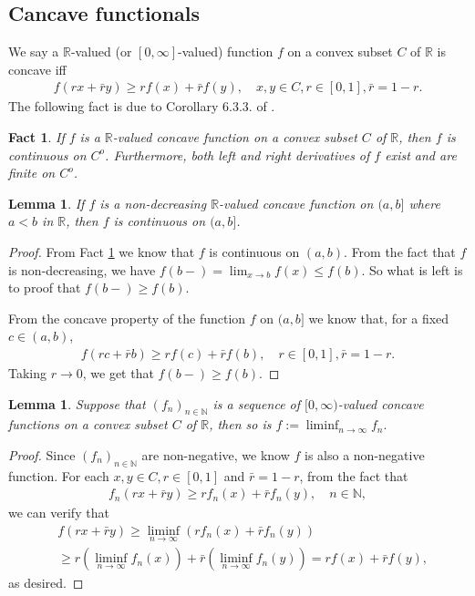 \documentclass[12pt,a4paper]{amsart}
\numberwithin{equation}{section}
\theoremstyle{plain}
\newtheorem{lem}[thm]{Lemma}
\newtheorem{fact}[thm]{Fact}
\theoremstyle{definition}
\theoremstyle{remark}
\begin{document}
\subsection{Cancave functionals}
We say a $\mathbb R$-valued (or $[0,\infty]$-valued) function $f$ on a convex subset $C$ of $\mathbb R$ is concave iff
\begin{align}
   f(rx+\bar r y) 
 \geq r f(x) + \bar r f(y),
 \quad x,y \in C, r \in [0,1], \bar r = 1 - r. 
 \end{align}
The following fact is due to Corollary 6.3.3. of \cite{Dudley2002Real}.
\begin{fact} \label{Fact:CC!} 
If $f$ is a $\mathbb R$-valued concave function on a convex subset $C$ of $\mathbb R$, then $f$ is continuous on $C^o$. 
Furthermore, both left and right derivatives of $f$ exist and are finite on $C^o$.
\end{fact}
\begin{lem} \label{Lemma:CR!} 
If $f$ is a non-decreasing $\mathbb R$-valued concave function on $(a,b]$ where $a<b$ in $\mathbb R$, then $f$ is continuous on $(a,b]$.
\end{lem}
\begin{proof}
From Fact \ref{Fact:CC!} we know that $ f $ is continuous on $(a,b)$. 
From the fact that $ f $ is non-decreasing, we have $f(b-) = \lim_{x \to b} f(x) \leq f(b)$. 
So what is left is to proof that $f(b-) \geq f(b)$. 

From the concave property of the function $f$ on $(a,b]$ we know that, for a fixed $c \in (a,b)$,
\begin{align}
 f(rc + \bar r b) 
 \geq r f(c) + \bar r f(b),
 \quad r\in [0,1], \bar r = 1 - r.
 \end{align}
Taking $r\to 0$, we get that $f(b-)\geq f(b)$.
\end{proof}
\begin{lem} \label{Lemma:CL!} 
Suppose that $(f_n)_{n \in \mathbb N}$ is a sequence of $[0,\infty)$-valued concave functions on a convex subset $C$ of $\mathbb R$, then so is $f:= \liminf_{n\to \infty} f_n.$
\end{lem}
\begin{proof}
Since $(f_n)_{n \in \mathbb N}$ are non-negative, we know $f$ is also a non-negative function. 
For each $x,y\in C, r\in [0,1]$ and $\bar r = 1 - r$, from the fact that
\begin{align}
   f_n(rx+\bar r y) 
 \geq r f_n(x) + \bar r f_n(y),
  \quad n \in \mathbb N,
 \end{align}
we can verify that
\begin{align}
 & f(rx+ \bar r y) 
 \geq \liminf_{n\to \infty} (r f_n(x) + \bar r f_n(y))
 \\&\geq r (\liminf_{n\to \infty} f_n(x)) + \bar r (\liminf_{n\to \infty} f_n(y)) 
 = rf(x) + \bar r f(y),
 \end{align}
as desired.
\end{proof}
\end{document}
